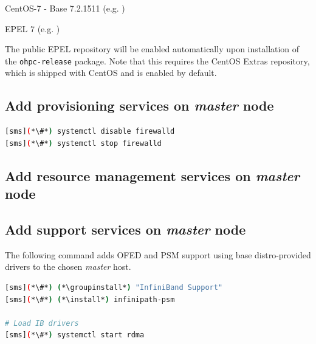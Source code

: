 \documentclass[letterpaper]{article}
\newcommand{\install}{yum -y install}
\newcommand{\groupinstall}{yum -y groupinstall}
\begin{document}
\begin{itemize*}
\item CentOS-7 - Base 7.2.1511
  (e.g. \href{http://mirror.centos.org/centos-7/7.2.1511/os/x86\_64}
             {\color{blue}{http://mirror.centos.org/centos-7/7.2.1511/os/x86\_64}} )
\item EPEL 7 (e.g. \href{http://download.fedoraproject.org/pub/epel/7/x86\_64}
                        {\color{blue}{http://download.fedoraproject.org/pub/epel/7/x86\_64}} )
\end{itemize*}

\noindent The public EPEL repository will be enabled automatically upon installation of the 
\texttt{ohpc-release} package. Note that this requires the CentOS Extras
repository, which is shipped with CentOS and is enabled by default.




\subsection{Add provisioning services on {\em master} node} \label{sec:add_provisioning}



\begin{lstlisting}[language=bash,keywords={}]
[sms](*\#*) systemctl disable firewalld
[sms](*\#*) systemctl stop firewalld
\end{lstlisting}



\subsection{Add resource management services on {\em master} node} \label{sec:add_rm}


\subsection{Add \InfiniBand{} support services on {\em master} node} \label{sec:add_ofed}

The following command adds OFED and PSM support using base distro-provided drivers
to the chosen {\em master} host.

\begin{lstlisting}[language=bash,keywords={}]
[sms](*\#*) (*\groupinstall*) "InfiniBand Support"
[sms](*\#*) (*\install*) infinipath-psm

# Load IB drivers
[sms](*\#*) systemctl start rdma
\end{lstlisting}
\end{document}
